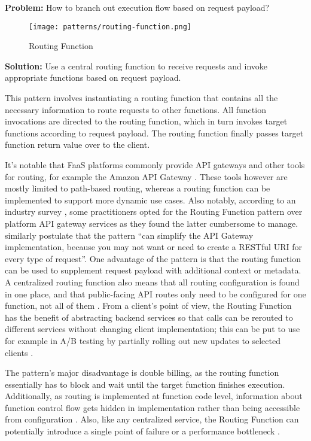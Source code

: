 \textbf{Problem:} How to branch out execution flow based on request payload?

\begin{figure}[h]
  \centering
  \texttt{[image: patterns/routing-function.png]}
  \caption{Routing Function}
  \label{fig:patternRoutingFunction}
\end{figure}

\textbf{Solution:} Use a central routing function to receive requests and invoke appropriate functions based on request payload.

This pattern involves instantiating a routing function that contains all the necessary information to route requests to other functions. All function invocations are directed to the routing function, which in turn invokes target functions according to request payload. The routing function finally passes target function return value over to the client.

It's notable that FaaS platforms commonly provide API gateways and other tools for routing, for example the Amazon API Gateway \parencite{awslambda0218}. These tools however are mostly limited to path-based routing, whereas a routing function can be implemented to support more dynamic use cases. Also notably, according to an industry survey \parencite{leitner18industrialpractice}, some practitioners opted for the Routing Function pattern over platform API gateway services as they found the latter cumbersome to manage. \textcite{sbarski2017serverless} similarly postulate that the pattern ``can simplify the API Gateway implementation, because you may not want or need to create a RESTful URI for every type of request''. One advantage of the pattern is that the routing function can be used to supplement request payload with additional context or metadata. A centralized routing function also means that all routing configuration is found in one place, and that public-facing API routes only need to be configured for one function, not all of them \parencite{leitner18industrialpractice}. From a client's point of view, the Routing Function has the benefit of abstracting backend services so that calls can be rerouted to different services without changing client implementation; this can be put to use for example in A/B testing by partially rolling out new updates to selected clients \parencite{microsoft18cloudPatterns}.

The pattern's major disadvantage is double billing, as the routing function essentially has to block and wait until the target function finishes execution. Additionally, as routing is implemented at function code level, information about function control flow gets hidden in implementation rather than being accessible from configuration \parencite{leitner18industrialpractice}. Also, like any centralized service, the Routing Function can potentially introduce a single point of failure or a performance bottleneck \parencite{microsoft18cloudPatterns}.

